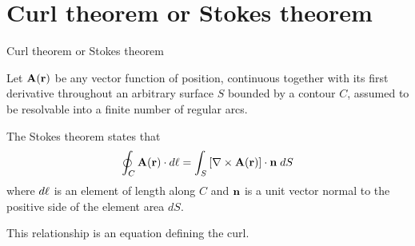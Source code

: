\documentclass[handout,10pt]{beamer}
\begin{document}
\section{Curl theorem or Stokes theorem}
\begin{frame}[shrink=00]{Curl theorem or Stokes theorem}

Let ${\bf A}({\bf r})$ be any vector function of position, continuous
together with its first derivative throughout an arbitrary surface $S$
bounded by a contour $C$, assumed to be resolvable into a finite number
of regular arcs. 


The \alert{Stokes theorem} states that
%
\begin{equation}
\oint_{C} {\bf A}({\bf r}) \cdot d{\bf \ell}  =
\int_{S} \left[ \nabla \times {\bf A}({\bf r})\right]
\cdot {\bf n} \; dS
\label{curleq}
\end{equation}
%
where $d{\bf \ell}$ is an element of length along $C$ and ${\bf n}$ is a
unit vector normal to the positive side of the element area $dS$.

This relationship is  an equation defining the
curl.


\end{frame}
\end{document}

